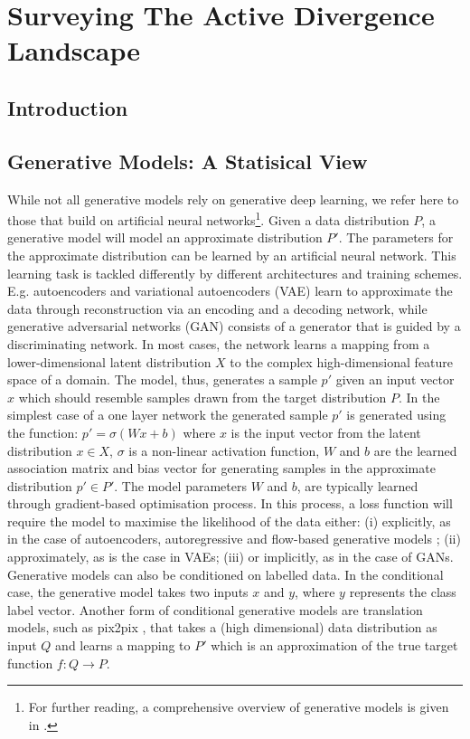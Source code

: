 \chapter{Surveying The Active Divergence Landscape}
\label{ch:active_div}

\section{Introduction}

\section{Generative Models: A Statisical View}

While not all generative models rely on generative deep learning, we refer here to those that build on artificial neural networks\footnote{
    For further reading, a comprehensive overview of generative models is given in \citet{harshvardhan2020comprehensive}.}. 
Given a data distribution $P$, a generative model will model an approximate distribution $P'$. 
The parameters for the approximate distribution can be learned by an artificial neural network. 
This learning task is tackled differently by different architectures and training schemes. 
E.g. autoencoders \citep{rumelhart1985learning} and variational autoencoders (VAE) \citep{kingma2013auto,rezende2014stochastic} learn to approximate the data through reconstruction via an encoding and a decoding network, while generative adversarial networks (GAN) \citep{goodfellow2014generative} consists of a generator that is guided by a discriminating network. 
In most cases, the network learns a mapping from a lower-dimensional latent distribution $X$ to the complex high-dimensional feature space of a domain. 
The model, thus, generates a sample $p'$ given an input vector $x$ which should resemble samples drawn from the target distribution $P$. 
In the simplest case of a one layer network the generated sample $p'$ is generated using the function: $p' = \sigma(Wx+b)$ where $x$ is the input vector from the latent distribution $x \in X$, $\sigma$ is a non-linear activation function, $W$ and $b$ are the learned association matrix and bias vector for generating samples in the approximate distribution $p' \in P'$. 
The model parameters $W$ and $b$, are typically learned through gradient-based optimisation process. 
In this process, a loss function will require the model to maximise the likelihood of the data either: (i) explicitly, as in the case of autoencoders, autoregressive \citep{frey1996does} and flow-based generative models \citep{dinh2014nice}; (ii) approximately, as is the case in VAEs; (iii) or implicitly, as in the case of GANs. Generative models can also be conditioned on labelled data. In the conditional case, the generative model takes two inputs $x$ and $y$, where $y$ represents the class label vector. 
Another form of conditional generative models are translation models, such as pix2pix \citep{isola2017image}, that takes a (high dimensional) data distribution as input $Q$ and learns a mapping to $P'$ which is an approximation of the true target function $f: Q \rightarrow P$.

